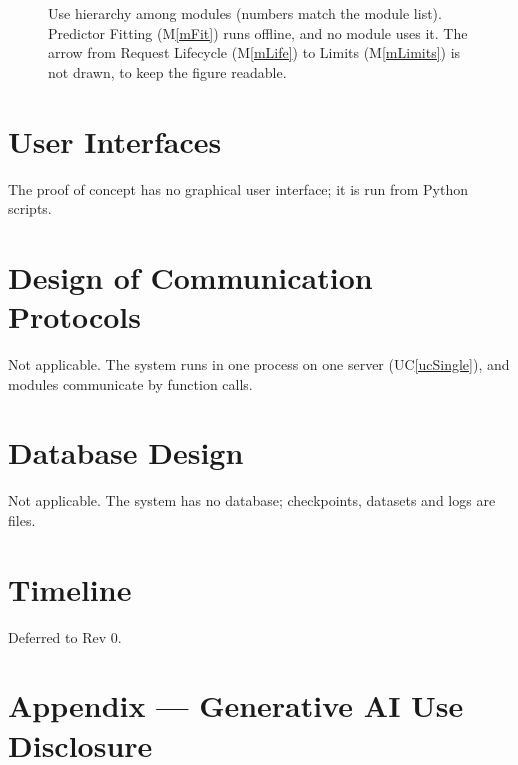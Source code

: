 \documentclass[12pt, titlepage]{article}
\newcommand{\uref}[1]{UC\ref{#1}}
\newcommand{\mref}[1]{M\ref{#1}}
\begin{document}
\begin{figure}[H]
{}
\caption{Use hierarchy among modules (numbers match the module list). Predictor
Fitting (\mref{mFit}) runs offline, and no module uses it. The arrow from Request
Lifecycle (\mref{mLife}) to Limits (\mref{mLimits}) is not drawn, to keep the
figure readable.}
\label{FigUH}
\end{figure}

\section{User Interfaces}

The proof of concept has no graphical user interface; it is run from Python
scripts.

\section{Design of Communication Protocols}

Not applicable. The system runs in one process on one server (\uref{ucSingle}),
and modules communicate by function calls.

\section{Database Design}

Not applicable. The system has no database; checkpoints, datasets and logs are
files.

\section{Timeline}

Deferred to Rev 0.

\section*{Appendix --- Generative AI Use Disclosure}
\end{document}

